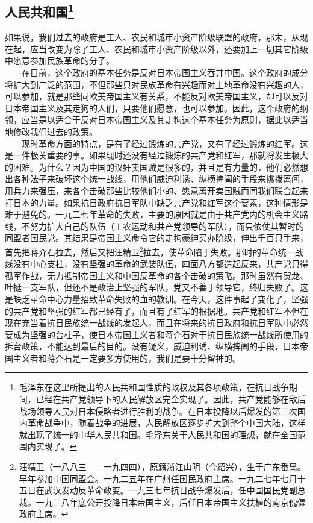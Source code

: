 \documentclass[cn,11pt,chinese]{elegantbook}
\def\myformat#1{\hfil\hfil #1}
\begin{document}
\subsection*{\myformat{人民共和国\footnote[30]{ 毛泽东在这里所提出的人民共和国性质的政权及其各项政策，在抗日战争期间，已经在共产党领导下的人民解放区完全实现了。因此，共产党能够在敌后战场领导人民对日本侵略者进行胜利的战争。在日本投降以后爆发的第三次国内革命战争中，随着战争的进展，人民解放区逐步扩大到整个中国大陆，这样就出现了统一的中华人民共和国。毛泽东关于人民共和国的理想，就在全国范围内实现了。}}}
如果说，我们过去的政府是工人、农民和城市小资产阶级联盟的政府，那末，从现在起，应当改变为除了工人、农民和城市小资产阶级以外，还要加上一切其它阶级中愿意参加民族革命的分子。\\
　　在目前，这个政府的基本任务是反对日本帝国主义吞并中国。这个政府的成分将扩大到广泛的范围，不但那些只对民族革命有兴趣而对土地革命没有兴趣的人，可以参加，就是那些同欧美帝国主义有关系，不能反对欧美帝国主义，却可以反对日本帝国主义及其走狗的人们，只要他们愿意，也可以参加。因此，这个政府的纲领，应当是以适合于反对日本帝国主义及其走狗这个基本任务为原则，据此以适当地修改我们过去的政策。\\
　　现时革命方面的特点，是有了经过锻炼的共产党，又有了经过锻炼的红军。这是一件极关重要的事。如果现时还没有经过锻炼的共产党和红军，那就将发生极大的困难。为什么？因为中国的汉奸卖国贼是很多的，并且是有力量的，他们必然想出各种法子来破坏这个统一战线，用他们威迫利诱、纵横捭阖的手段来挑拨离间，用兵力来强压，来各个击破那些比较他们小的、愿意离开卖国贼而同我们联合起来打日本的力量。如果抗日政府抗日军队中缺乏共产党和红军这个要素，这种情形是难于避免的。一九二七年革命的失败，主要的原因就是由于共产党内的机会主义路线，不努力扩大自己的队伍（工农运动和共产党领导的军队），而只依仗其暂时的同盟者国民党。其结果是帝国主义命令它的走狗豪绅买办阶级，伸出千百只手来，首先把蒋介石拉去，然后又把汪精卫\footnote[31]{ 汪精卫（一八八三——一九四四），原籍浙江山阴（今绍兴），生于广东番禺。早年参加中国同盟会。一九二五年在广州任国民政府主席。一九二七年七月十五日在武汉发动反革命政变。一九三七年抗日战争爆发后，任中国国民党副总裁。一九三八年底公开投降日本帝国主义，后任日本帝国主义扶植的南京傀儡政府主席。}拉去，使革命陷于失败。那时的革命统一战线没有中心支柱，没有坚强的革命的武装队伍，四面八方都造起反来，共产党只得孤军作战，无力抵制帝国主义和中国反革命的各个击破的策略。那时虽然有贺龙、叶挺一支军队，但还不是政治上坚强的军队，党又不善于领导它，终归失败了。这是缺乏革命中心力量招致革命失败的血的教训。在今天，这件事起了变化了，坚强的共产党和坚强的红军都已经有了，而且有了红军的根据地。共产党和红军不但在现在充当着抗日民族统一战线的发起人，而且在将来的抗日政府和抗日军队中必然要成为坚强的台柱子，使日本帝国主义者和蒋介石对于抗日民族统一战线所使用的拆台政策，不能达到最后的目的。没有疑义，威迫利诱、纵横捭阖的手段，日本帝国主义者和蒋介石是一定要多方使用的，我们是要十分留神的。\\
\end{document}
